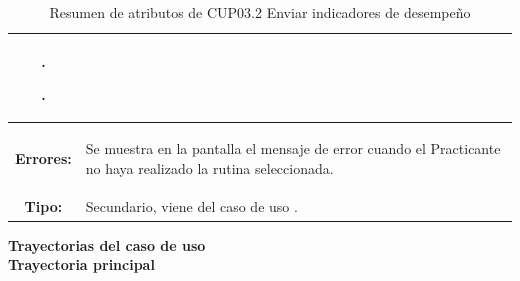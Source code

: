 \begin{table}[H]
\begin{tabular}{| c | p{12 cm} |}
							\begin{compactitem}
								\item \nameref{rn:RNR28}.
								\item \nameref{rn:RNR33}.
							\end{compactitem}\\							
\hline
\textbf{Errores:} & \vspace{-2mm}	%
					\begin{compactitem}
						\setlength\itemsep{-0.25em}
						\item Se muestra en la pantalla \nameref{pant:IUP03} el mensaje de error \nameref{msj:MSG21} cuando el Practicante no haya realizado la rutina seleccionada.
					\end{compactitem}\\
\hline
\textbf{Tipo:} & Secundario, viene del caso de uso \nameref{cu:CUP03}.\\
\hline	
\end{tabular}
\caption{Resumen de atributos de CUP03.2 Enviar indicadores de desempeño}
\label{tab:CUP03.2}
\end{table} 

\textbf{\textcolor[rgb]{0, 0, 0.545098}{Trayectorias del caso de uso}} \\

\textbf{\large{Trayectoria principal}} \\

